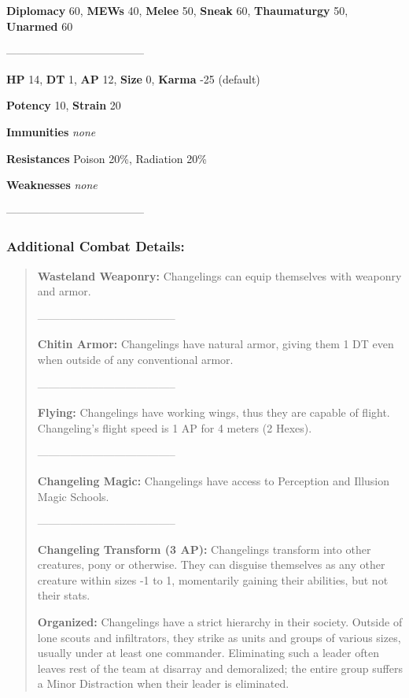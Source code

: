 \documentclass[11pt,a4paper,twocolumn]{book}
\begin{document}
		\noindent
		\textbf{Diplomacy} 60, \textbf{MEWs} 40, \textbf{Melee} 50, \textbf{Sneak} 60, \textbf{Thaumaturgy} 50, \textbf{Unarmed} 60
		
		--------------------------------------
		
		\noindent
		\textbf{HP} 14, \textbf{DT} 1, \textbf{AP} 12, \textbf{Size} 0, \textbf{Karma} -25 (default)
		
		\noindent
		\textbf{Potency} 10, \textbf{Strain} 20
		
		\noindent
		\textbf{Immunities} \emph{none}
		
		\noindent
		\textbf{Resistances} Poison 20\%, Radiation 20\%
		
		\noindent
		\textbf{Weaknesses} \emph{none} %
		
		--------------------------------------
	
	\subsubsection*{Additional Combat Details:}
	\begin{verse}		
		
		\textbf{Wasteland Weaponry:} Changelings can equip themselves with weaponry and armor.
		
		--------------------------------------
		
		\textbf{Chitin Armor:} Changelings have natural armor, giving them 1 DT even when outside of any conventional armor.
		
		--------------------------------------
		
		\textbf{Flying:} Changelings have working wings, thus they are capable of flight. Changeling's flight speed is 1 AP for 4 meters (2 Hexes). 
		
		--------------------------------------
			
		\textbf{Changeling Magic:} Changelings have access to Perception and Illusion Magic Schools.
		
		--------------------------------------		
		
		\textbf{Changeling Transform (3 AP):} Changelings transform into other creatures, pony or otherwise. They can disguise themselves as any other creature within sizes -1 to 1, momentarily gaining their abilities, but not their stats.
				
		\textbf{Organized:} Changelings have a strict hierarchy in their society. Outside of lone scouts and infiltrators, they strike as units and groups of various sizes, usually under at least one commander. Eliminating such a leader often leaves rest of the team at disarray and demoralized; the entire group suffers a Minor Distraction when their leader is eliminated.
		
	\end{verse}
	
\end{document}
